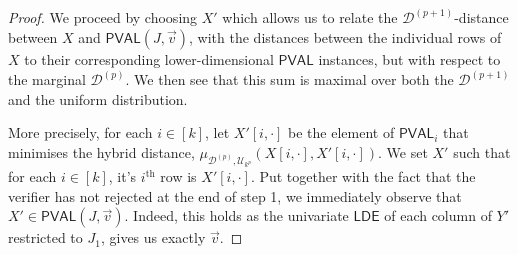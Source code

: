 \documentclass[11pt]{article}
\newcommand{\PVAL}{\mathsf{PVAL}}
\newcommand{\LDE}{\mathsf{LDE}}
\newcommand{\sD}{\mathcal{D}}
\begin{document}
\begin{proof}
We proceed by choosing $X'$ which allows us to relate the $\sD^{(p+1)}$-distance between $X$ and $\PVAL(J,\Vec{v})$, with the distances between the individual rows of $X$ to their corresponding lower-dimensional $\PVAL$ instances, but with respect to the marginal $\sD^{(p)}$. We then see that this sum is maximal over both the $\mathcal{D}^{(p+1)}$ and the uniform distribution. 

More precisely, for each $i\in[k]$, let $X'[i,\cdot]$ be the element of $\PVAL_{i}$ that minimises the hybrid distance, $\mu_{\mathcal{D}^{(p)},\mathcal{U}_{k^{p}}}(X[i,\cdot], X'[i,\cdot])$. We set $X'$ such that for each $i \in [k]$, it's $i^{\text{th}}$ row is $X'[i,\cdot]$. Put together with the fact that the verifier has not rejected at the end of step 1, we immediately observe that $X' \in \PVAL(J,\vec{v})$. Indeed, this holds as the univariate $\LDE$ of each column of $Y'$ restricted to $J_1$, gives us exactly $\Vec{v}$.


\end{proof}
\end{document}
